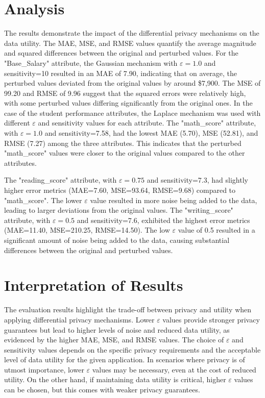 \section{Analysis}
The results demonstrate the impact of the differential privacy mechanisms on the data utility. The MAE, MSE, and RMSE values quantify the average magnitude and squared differences between the original and perturbed values.
For the "Base\_Salary" attribute, the Gaussian mechanism with $\varepsilon=1.0$ and sensitivity=10 resulted in an MAE of 7.90, indicating that on average, the perturbed values deviated from the original values by around \$7,900. The MSE of 99.20 and RMSE of 9.96 suggest that the squared errors were relatively high, with some perturbed values differing significantly from the original ones.
In the case of the student performance attributes, the Laplace mechanism was used with different $\varepsilon$ and sensitivity values for each attribute. The "math\_score" attribute, with $\varepsilon=1.0$ and sensitivity=7.58, had the lowest MAE (5.70), MSE (52.81), and RMSE (7.27) among the three attributes. This indicates that the perturbed "math\_score" values were closer to the original values compared to the other attributes.

The "reading\_score" attribute, with $\varepsilon=0.75$ and sensitivity=7.3, had slightly higher error metrics (MAE=7.60, MSE=93.64, RMSE=9.68) compared to "math\_score". The lower $\varepsilon$ value resulted in more noise being added to the data, leading to larger deviations from the original values.
The "writing\_score" attribute, with $\varepsilon=0.5$ and sensitivity=7.6, exhibited the highest error metrics (MAE=11.40, MSE=210.25, RMSE=14.50). The low $\varepsilon$ value of 0.5 resulted in a significant amount of noise being added to the data, causing substantial differences between the original and perturbed values.

\section{Interpretation of Results}
The evaluation results highlight the trade-off between privacy and utility when applying differential privacy mechanisms. Lower $\varepsilon$ values provide stronger privacy guarantees but lead to higher levels of noise and reduced data utility, as evidenced by the higher MAE, MSE, and RMSE values.
The choice of $\varepsilon$ and sensitivity values depends on the specific privacy requirements and the acceptable level of data utility for the given application. In scenarios where privacy is of utmost importance, lower $\varepsilon$ values may be necessary, even at the cost of reduced utility. On the other hand, if maintaining data utility is critical, higher $\varepsilon$ values can be chosen, but this comes with weaker privacy guarantees.

